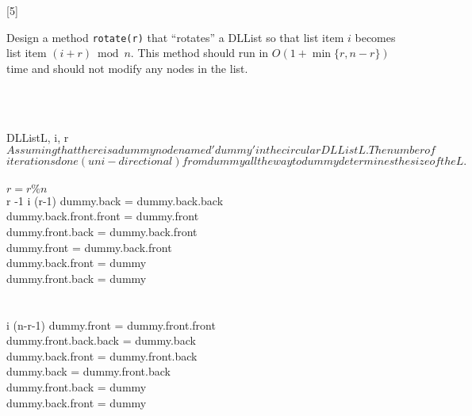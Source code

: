 \documentclass[addpoints]{exam}
\begin{document}
\begin{questions}
	
	Design a method {\tt rotate(r)} that ``rotates'' a DLList so that list item $i$ becomes list item $(i + r) \bmod n$. This method should run in $O(1 + \min\{r, n-r\})$ time and should not modify any nodes in the list.
	\begin{solution}\\ \\
		\begin{pseudocode}{DLList}{L, i, r}
			\label{DLList}
			\\
			$Assuming that there is a dummy node named 'dummy' in the circular DLList L. The number of$\\ $iterations done (uni-directional) from \textit{dummy} all the way to \textit{dummy} determines the size of the L.$\\ \\
			$r=r\%n$\\
				\IF 
					r -1 
				\THEN
					\BEGIN
						\FOR i \TO (r-1) \DO 
							\BEGIN
								dummy.back = dummy.back.back\\
								dummy.back.front.front = dummy.front \\
								dummy.front.back = dummy.back.front \\
								dummy.front = dummy.back.front \\
								dummy.back.front = dummy \\
								dummy.front.back = dummy\\
							\END\\ 
					\END \\
				\ELSE
					\BEGIN
						\FOR i \TO (n-r-1) \DO 
							\BEGIN
								dummy.front = dummy.front.front\\
								dummy.front.back.back = dummy.back \\
								dummy.back.front = dummy.front.back \\
								dummy.back = dummy.front.back \\
								dummy.front.back = dummy \\
								dummy.back.front = dummy\\
							\END\\ 
					\END \\ 
			\ENDPROCEDURE
		\end{pseudocode}
	\end{solution}
	\pagebreak
	

\end{questions}
\end{document}
